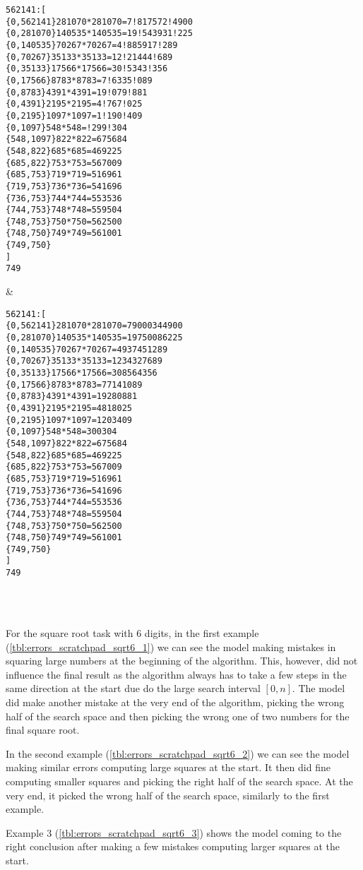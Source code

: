 \ErrorAnalysisTableBegin
\begin{lstlisting}
562141:[
{0,562141}281070*281070=7!817572!4900
{0,281070}140535*140535=19!543931!225
{0,140535}70267*70267=4!885917!289
{0,70267}35133*35133=12!21444!689
{0,35133}17566*17566=30!5343!356
{0,17566}8783*8783=7!6335!089
{0,8783}4391*4391=19!079!881
{0,4391}2195*2195=4!767!025
{0,2195}1097*1097=1!190!409
{0,1097}548*548=!299!304
{548,1097}822*822=675684
{548,822}685*685=469225
{685,822}753*753=567009
{685,753}719*719=516961
{719,753}736*736=541696
{736,753}744*744=553536
{744,753}748*748=559504
{748,753}750*750=562500
{748,750}749*749=561001
{749,750}
]
749
\end{lstlisting} &
\begin{lstlisting}
562141:[
{0,562141}281070*281070=79000344900
{0,281070}140535*140535=19750086225
{0,140535}70267*70267=4937451289
{0,70267}35133*35133=1234327689
{0,35133}17566*17566=308564356
{0,17566}8783*8783=77141089
{0,8783}4391*4391=19280881
{0,4391}2195*2195=4818025
{0,2195}1097*1097=1203409
{0,1097}548*548=300304
{548,1097}822*822=675684
{548,822}685*685=469225
{685,822}753*753=567009
{685,753}719*719=516961
{719,753}736*736=541696
{736,753}744*744=553536
{744,753}748*748=559504
{748,753}750*750=562500
{748,750}749*749=561001
{749,750}
]
749
\end{lstlisting} \\
\\

For the square root task with 6 digits, in the first example (\cref{tbl:errors_scratchpad_sqrt6_1}) we can see the model making mistakes in squaring large numbers at the beginning of the algorithm. This, however, did not influence the final result as the algorithm always has to take a few steps in the same direction at the start due do the large search interval $[0, n]$.
The model did make another mistake at the very end of the algorithm, picking the wrong half of the search space and then picking the wrong one of two numbers for the final square root.

In the second example (\cref{tbl:errors_scratchpad_sqrt6_2}) we can see the model making similar errors computing large squares at the start. It then did fine computing smaller squares and picking the right half of the search space. At the very end, it picked the wrong half of the search space, similarly to the first example.

Example 3 (\cref{tbl:errors_scratchpad_sqrt6_3}) shows the model coming to the right conclusion after making a few mistakes computing larger squares at the start.

